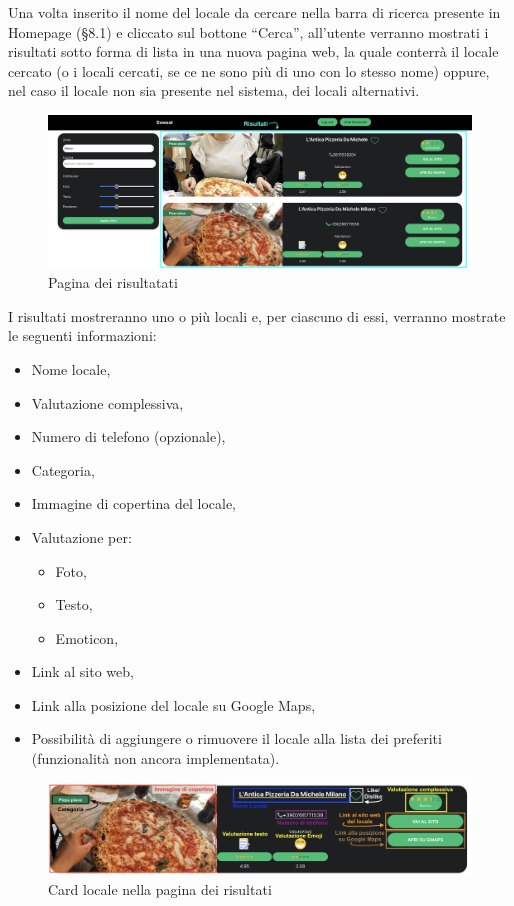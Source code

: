 
Una volta inserito il nome del locale da cercare nella barra di ricerca presente in Homepage (\S{8.1}) e cliccato sul bottone “Cerca”, all’utente verranno mostrati i risultati sotto forma di lista in una nuova pagina web, la quale conterrà il locale cercato (o i locali cercati, se ce ne sono più di uno con lo stesso nome) oppure, nel caso il locale non sia presente nel sistema, dei locali alternativi.

\begin{figure}[H]
\centering
\includegraphics[scale=0.3]{./images/Ricerca/Ricerca.png} 
\caption{Pagina dei risultatati}
\end{figure}

I risultati mostreranno uno o più locali e, per ciascuno di essi, verranno mostrate le seguenti informazioni:

\begin{itemize}
\item Nome locale,
\item Valutazione complessiva,
\item Numero di telefono (opzionale),
\item Categoria,
\item Immagine di copertina del locale,
\item Valutazione per:
\begin{itemize}
\item Foto,
\item Testo,
\item Emoticon,
\end{itemize}
\item Link al sito web,
\item Link alla posizione del locale su Google Maps,
\item Possibilità di aggiungere o rimuovere il locale alla lista dei preferiti (funzionalità non ancora implementata).
\end{itemize}

\begin{figure}[H]
\centering
\includegraphics[scale=0.4]{./images/Ricerca/Card.png} 
\caption{Card locale nella pagina dei risultati}
\end{figure}

